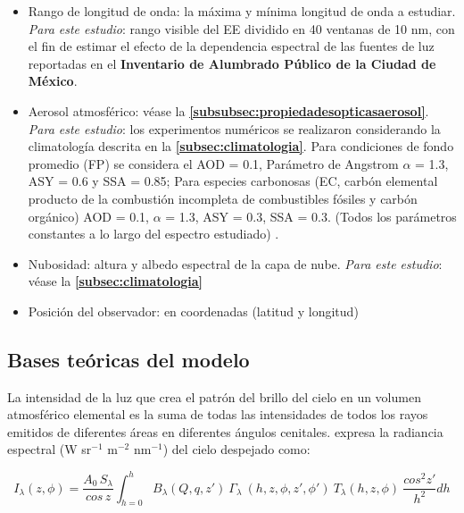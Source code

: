 \begin{itemize}

    \item Rango de longitud de onda: la máxima y mínima longitud de onda a estudiar. \textit{Para este estudio}: rango visible del EE dividido en 40 ventanas de 10 nm, con el fin  de estimar el efecto de la dependencia espectral de las fuentes de luz reportadas en el \textbf{Inventario de Alumbrado Público de la Ciudad de México}.
    
    \item Aerosol atmosférico: véase la \textbf{\autoref{subsubsec:propiedadesopticasaerosol}}. \textit{Para este estudio}: los experimentos numéricos se realizaron considerando la climatología descrita en la \textbf{\autoref{subsec:climatologia}}. Para condiciones de fondo promedio (FP) se considera el AOD = 0.1, Parámetro de Angstrom $\alpha$ = 1.3, ASY = 0.6 y SSA = 0.85; Para especies carbonosas (EC, carbón elemental producto de la combustión incompleta de combustibles fósiles y carbón orgánico) AOD = 0.1, $\alpha$ = 1.3, ASY = 0.3, SSA = 0.3. (Todos los parámetros constantes a lo largo del espectro estudiado) \citep{Penner1998,Schmidt2010}.
    
    \item Nubosidad: altura y albedo espectral de la capa de nube. \textit{Para este estudio}: véase la \textbf{\autoref{subsec:climatologia}}
    
    \item Posición del observador: en coordenadas (latitud y longitud) 
    
\end{itemize}

\subsection{Bases teóricas del modelo}

La intensidad de la luz que crea el patrón del brillo del cielo en un volumen atmosférico elemental es la suma de todas las intensidades de todos los rayos emitidos de diferentes áreas en diferentes ángulos cenitales. \cite{Kocifaj2007} expresa la radiancia espectral (W sr$^{-1}$  m$^{-2}$ nm$^{-1}$) del cielo despejado como:

\begin{equation}\label{eq:2.1}
I_{\lambda}(z, \phi) = \frac{A_{0}\, S_{\lambda}}{cos\,z} \int_{h=0}^{h} B_{\lambda}(Q, q, z') \: \Gamma_{\lambda} \:(h, z, \phi, z', \phi') \: T_{\lambda}(h, z, \phi) \: \frac{cos^{2}z'}{h^{2}} dh
\end{equation}

